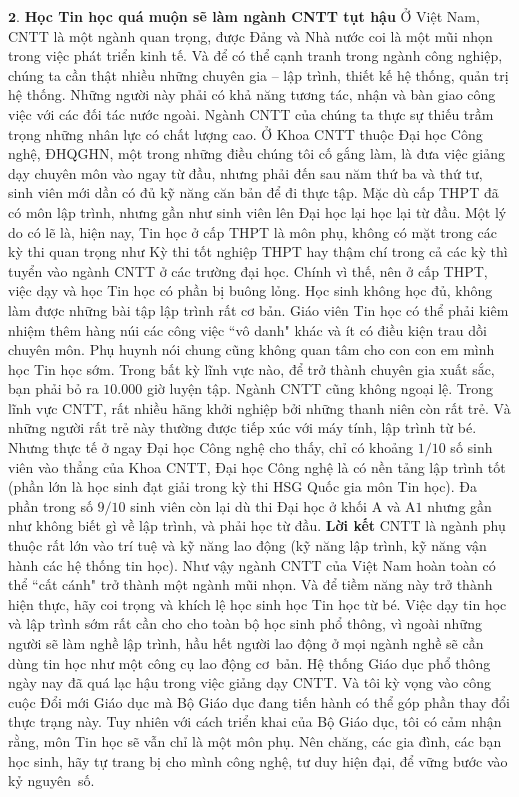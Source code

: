 \begin{multicols}{2}
	\vskip 0.05cm
	$\pmb{2.}$ \textbf{\color{diendantoanhoc}Học Tin học quá muộn sẽ làm ngành CNTT tụt hậu}
	\vskip 0.05cm
	Ở Việt Nam, CNTT là một ngành quan trọng, được Đảng và Nhà nước coi là một mũi nhọn trong việc phát triển kinh tế. Và để có thể cạnh tranh trong ngành công nghiệp, chúng ta cần thật nhiều những chuyên gia -- lập trình, thiết kế hệ thống, quản trị hệ thống. Những người này phải có khả năng tương tác, nhận và bàn giao công việc với các đối tác nước ngoài. Ngành CNTT của chúng ta thực sự thiếu trầm trọng những nhân lực có chất lượng cao.
	\vskip 0.05cm
	Ở Khoa CNTT thuộc Đại học Công nghệ, ĐHQGHN, một trong những điều chúng tôi cố gắng làm, là đưa việc giảng dạy chuyên môn vào ngay từ đầu, nhưng phải đến sau năm thứ ba và thứ tư, sinh viên mới dần có đủ kỹ năng căn bản để đi thực tập. Mặc dù cấp THPT đã có môn lập trình, nhưng gần như sinh viên lên Đại học lại học lại từ đầu.
	\vskip 0.05cm
	Một lý do có lẽ là, hiện nay, Tin học ở cấp THPT là môn phụ, không có mặt trong các kỳ thi quan trọng như Kỳ thi tốt nghiệp THPT hay thậm chí trong cả các kỳ thì tuyển vào ngành CNTT ở các trường đại học. Chính vì thế, nên ở cấp THPT, việc dạy và học Tin học có phần bị buông lỏng. Học sinh không học đủ, không làm được những bài tập lập trình rất cơ bản. Giáo viên Tin học có thể phải kiêm nhiệm thêm hàng núi các công việc ``vô danh" khác và ít có điều kiện trau dồi chuyên môn. Phụ huynh nói chung cũng không quan tâm cho con con em mình học Tin học sớm.
	\vskip 0.05cm
	Trong bất kỳ lĩnh vực nào, để trở thành chuyên gia xuất sắc, bạn phải bỏ ra $10{.}000$ giờ luyện tập. Ngành CNTT cũng không ngoại lệ. Trong lĩnh vực CNTT, rất nhiều hãng khởi nghiệp bởi những thanh niên còn rất trẻ. Và những người rất trẻ này thường được tiếp xúc với máy tính, lập trình từ bé. Nhưng thực tế ở ngay Đại học Công nghệ cho thấy, chỉ có khoảng $1/10$ số sinh viên vào thẳng của Khoa CNTT, Đại học Công nghệ là có nền tảng lập trình tốt (phần lớn là học sinh đạt giải trong kỳ thi HSG Quốc gia môn Tin học). Đa phần trong số $9/10$ sinh viên còn lại dù thi Đại học ở khối A và A$1$ nhưng gần như không biết gì về lập trình, và phải học từ đầu. 
	\vskip 0.05cm
	\textbf{\color{diendantoanhoc}Lời kết}
	\vskip 0.05cm
	CNTT là ngành phụ thuộc rất lớn vào trí tuệ và kỹ năng lao động (kỹ năng lập trình, kỹ năng vận hành các hệ thống tin học). Như vậy ngành CNTT của Việt Nam hoàn toàn có thể ``cất cánh" trở thành một ngành mũi nhọn. Và để tiềm năng này trở thành hiện thực, hãy coi trọng và khích lệ học sinh học Tin học từ bé.
	\vskip 0.05cm
	Việc dạy tin học và lập trình sớm rất cần cho cho toàn bộ học sinh phổ thông, vì ngoài những người sẽ làm nghề lập trình, hầu hết người lao động ở mọi ngành nghề sẽ cần dùng tin học như một công cụ lao động cơ~bản. 
	\vskip 0.05cm
	Hệ thống Giáo dục phổ thông ngày nay đã quá lạc hậu trong việc giảng dạy CNTT. Và tôi kỳ vọng vào công cuộc Đổi mới Giáo dục mà Bộ Giáo dục đang tiến hành có thể góp phần thay đổi thực trạng này. Tuy nhiên với cách triển khai của Bộ Giáo dục, tôi có cảm nhận rằng, môn Tin học sẽ vẫn chỉ là một môn phụ. Nên chăng, các gia đình, các bạn học sinh, hãy tự trang bị cho mình công nghệ, tư duy hiện đại, để vững bước vào kỷ nguyên~số.
\end{multicols}